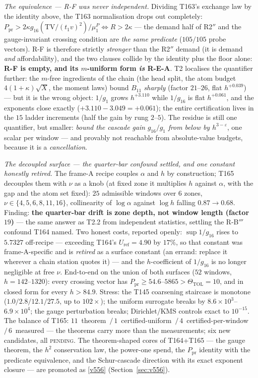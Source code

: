 \documentclass[11pt,a4paper]{article}
\begin{document}
\emph{The equivalence --- R-F was never independent.} Dividing T163's exchange
law by the identity above, the T163 normalisation drops out completely:
$P_{\mathrm{pr}}>2\kappa g_{16}(\mathrm{TV}/(t_1v)^2)/\mu^P_1\iff R>2\kappa$
--- the demand half of R2$''$ and the gauge-invariant crossing condition are
\emph{the same predicate} ($105/105$ probe vectors). R-F is therefore strictly
\emph{stronger} than the R2$''$ demand (it is demand \emph{and}
affordability), and the two clauses collide by the identity plus the floor
alone: \textbf{R-F is empty, and its $m$-uniform form \emph{is} R-E-A}. T2
localises the quantifier further: the $m$-free ingredients of the chain (the
head split, the atom budget $4(1+\kappa)\sqrt X$, the moment laws) bound
$B_{11}$ \emph{sharply} (factor $21$--$26$, flat $h^{+0.039}$) --- but it is
the wrong object: $1/g_1$ grows $h^{+3.110}$ while $1/g_{16}$ is flat
$h^{+0.061}$, and the exponents close exactly ($+3.110-3.049=+0.061$); the
entire certification lives in the $15$ ladder increments (half the gain by
rung $2$--$5$). The residue is still one quantifier, but smaller: \emph{bound
the cascade gain $g_{16}/g_1$ from below by $h^{3-\varepsilon}$}, one scalar
per window --- and provably not reachable from absolute-value budgets, because
it is a \emph{cancellation}.

\emph{The decoupled surface --- the quarter-bar confound settled, and one
constant honestly retired.} The frame-A recipe couples $\alpha$ and $h$ by
construction; T165 decouples them with $\nu$ as a knob (at fixed zone it
multiplies $h$ against $\alpha$, with the gap and the atom set fixed): $25$
admissible windows over $6$ zones, $\nu\in\{4,5,6,8,11,16\}$, collinearity of
$\log\alpha$ against $\log h$ falling $0.87\to0.68$. Finding: \textbf{the
quarter-bar drift is zone depth, not window length (factor $19$)} --- the same
answer as T2.2 from independent statistics, settling the R-B$'''$ confound
T164 named. Two honest costs, reported openly: $\sup1/g_{16}$ rises to
$5.7327$ off-recipe --- exceeding T164's $U_{\mathrm{ref}}=4.90$ by $17\%$,
so that constant was frame-A-specific and is \emph{retired} as a surface
constant (an errand: replace it wherever a chain station quotes it) --- and
the $h$-coefficient of $1/g_{16}$ is no longer negligible at free $\nu$.
End-to-end on the union of both surfaces ($52$ windows, $h=142$--$1320$):
every crossing vector has $P_{\mathrm{pr}}\ge54.6$--$5865>\Theta_{\mathrm{TOL}}=10$,
and in closed form for every $h>84.9$. Stress: the T145 coarsening staircase
is monotone ($1.0/2.8/12.1/27.5$, up to $102\times$); the uniform surrogate
breaks by $8.6\times10^{3}$--$6.9\times10^{4}$; the gauge perturbation breaks;
Dirichlet/KMS controls exact to $10^{-15}$. The balance of T165:
$11$~theorem~$/\,1$~certified-uniform~$/\,4$~certified-per-window~$/\,
6$~measured --- the theorems carry more than the measurements; six new
candidates, all \textsc{pending}. The theorem-shaped cores of T164+T165 ---
the gauge theorem, the $h^2$ conservation law, the power-one spend, the
$P_{\mathrm{pr}}$ identity with the predicate equivalence, and the
Schur-cascade direction with its exact exponent closure --- are promoted as
\vref{v556}  (Section~\ref{sec:v556}).
\end{document}
